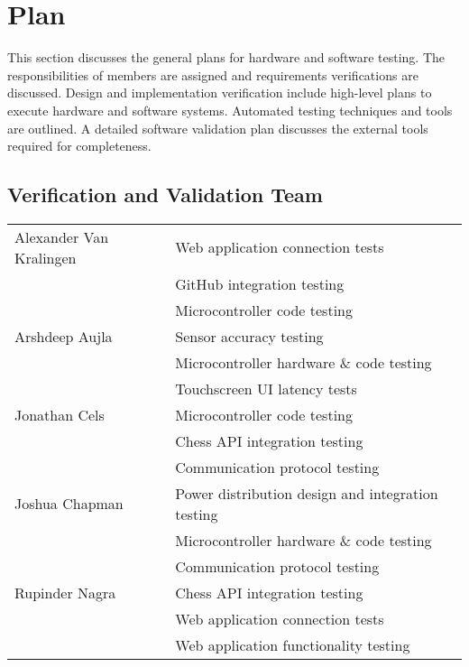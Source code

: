 \documentclass[12pt, titlepage]{article}
\begin{document}
\section{Plan}
This section discusses the general plans for hardware and software testing. The 
responsibilities of members are assigned and requirements verifications are discussed. 
Design and implementation verification include high-level plans to execute hardware 
and software systems. Automated testing techniques and tools are outlined. 
A detailed software validation plan discusses the external tools required for 
completeness. 

\subsection{Verification and Validation Team}

\begin{tabular}{ |p{4.5cm}||p{9cm}|  }
 \hline
 Alexander Van Kralingen & Web application connection tests\\
 & GitHub integration testing\\
 & Microcontroller code testing\\
 \hline
 Arshdeep Aujla & Sensor accuracy testing\\
 & Microcontroller hardware \& code testing\\
 & Touchscreen UI latency tests\\
 \hline
 Jonathan Cels & Microcontroller code testing\\
 & Chess API integration testing\\
 & Communication protocol testing\\
 \hline
 Joshua Chapman& Power distribution design and integration testing\\
 & Microcontroller hardware \& code testing\\
 & Communication protocol testing\\
 \hline
 Rupinder Nagra & Chess API integration testing\\ 
 & Web application connection tests\\
 & Web application functionality testing\\
 \hline
\end{tabular}
\end{document}
